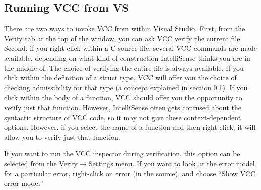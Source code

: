 \subsection{Running VCC from VS}
There are two ways to invoke VCC from within Visual
Studio. First,
from the Verify tab at the top of the window, you can ask VCC verify
the current file. Second, if you right-click within a C source file,
several VCC commands are made available, depending on what kind of
construction IntelliSense thinks you are in the middle of. The choice
of verifying the entire file is always available. If you click within
the definition of a struct type, VCC will offer you the choice of
checking admissibility for that type (a concept explained in
section \ref{}). If you click within the body of a function, VCC should offer
you the opportunity to verify just that function. However,
IntelliSense often gets confused about the syntactic structure of
VCC code, so it may not give these context-dependent
options. However, if you select the name of a function and then right
click, it will allow you to verify just that function.

If you want to run the VCC inspector during verification, this
option can be selected from the Verify$\rightarrow$Settings menu. If you want
to look at the error model for a particular error, right-click on
error (in the source), and choose ``Show VCC error model''

